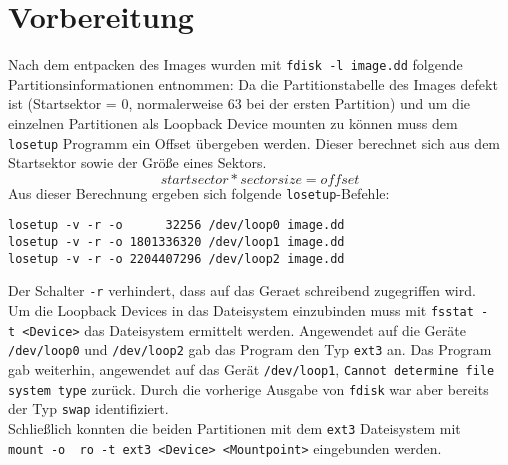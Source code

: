 \section{Vorbereitung}

Nach dem entpacken des Images wurden mit \texttt{fdisk~-l~image.dd} folgende Partitionsinformationen entnommen:
\lstset{basicstyle=\footnotesize}
Da die Partitionstabelle des Images defekt ist (Startsektor = 0, normalerweise 63 bei der ersten Partition) und um die einzelnen Partitionen als Loopback Device mounten zu können muss dem \texttt{losetup} Programm ein Offset übergeben werden. Dieser berechnet sich aus dem Startsektor sowie der Größe eines Sektors.\[startsector*sectorsize=offset\]
Aus dieser Berechnung ergeben sich folgende \texttt{losetup}-Befehle:

\begin{verbatim}
losetup -v -r -o      32256 /dev/loop0 image.dd
losetup -v -r -o 1801336320 /dev/loop1 image.dd
losetup -v -r -o 2204407296 /dev/loop2 image.dd
\end{verbatim}
\noindent Der Schalter \texttt{-r} verhindert, dass auf das Geraet schreibend zugegriffen wird.\\

Um die Loopback Devices in das Dateisystem einzubinden muss mit \texttt{fsstat~-t~<Device>} das Dateisystem ermittelt werden. Angewendet auf die Geräte \texttt{/dev/loop0} und \texttt{/dev/loop2} gab das Program den Typ \texttt{ext3} an. Das Program gab weiterhin, angewendet auf das Gerät \texttt{/dev/loop1}, \texttt{Cannot determine file system type} zurück. Durch die vorherige Ausgabe von \texttt{fdisk} war aber bereits der Typ \texttt{swap} identifiziert.\\

Schließlich konnten die beiden Partitionen mit dem \texttt{ext3} Dateisystem mit \texttt{mount~-o ~ro~-t~ext3~<Device>~<Mountpoint>} eingebunden werden.